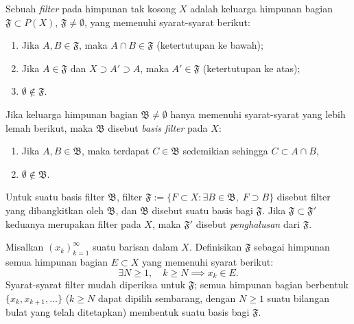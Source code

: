 \begin{definition}
	Sebuah \emph{filter} pada himpunan tak kosong $X$ adalah keluarga himpunan bagian $\mathfrak{F} \subset P(X)$, $\mathfrak{F} \neq \emptyset$, yang memenuhi syarat-syarat berikut:
	\begin{enumerate}[\bfseries {F}.1]
		\item Jika $A, B \in \mathfrak{F}$, maka $A \cap B \in \mathfrak{F}$ (ketertutupan ke bawah);
		\item Jika $A \in \mathfrak{F}$ dan $X \supset A' \supset A$, maka $A' \in \mathfrak{F}$ (ketertutupan ke atas);
		\item $\emptyset \notin \mathfrak{F}$.
	\end{enumerate}
	Jika keluarga himpunan bagian $\mathfrak{B} \neq \emptyset$ hanya memenuhi syarat-syarat yang lebih lemah berikut, maka $\mathfrak{B}$ disebut \emph{basis filter} pada $X$:
	\begin{enumerate}[\bfseries {FB}.1]
		\item Jika $A, B \in \mathfrak{B}$, maka terdapat $C \in \mathfrak{B}$ sedemikian sehingga $C \subset A \cap B$,
		\item $\emptyset \notin \mathfrak{B}$.
	\end{enumerate}
	Untuk suatu basis filter $\mathfrak{B}$, filter $\mathfrak{F} := \{ F \subset X: \exists B \in \mathfrak{B},\; F \supset B \}$ disebut filter yang dibangkitkan oleh $\mathfrak{B}$, dan $\mathfrak{B}$ disebut suatu basis bagi $\mathfrak{F}$. Jika $\mathfrak{F} \subset \mathfrak{F}'$ keduanya merupakan filter pada $X$, maka $\mathfrak{F}'$ disebut \emph{penghalusan} dari $\mathfrak{F}$.
\end{definition}

\begin{example}\label{eg:sequence-as-filter}
	Misalkan $(x_k)_{k=1}^\infty$ suatu barisan dalam $X$. Definisikan $\mathfrak{F}$ sebagai himpunan semua himpunan bagian $E \subset X$ yang memenuhi syarat berikut:
	\[ \exists N \geq 1, \quad k \geq N \implies x_k \in E . \]
	Syarat-syarat filter mudah diperiksa untuk $\mathfrak{F}$; semua himpunan bagian berbentuk $\{ x_k, x_{k+1}, \ldots\}$ ($k \geq N$ dapat dipilih sembarang, dengan $N \geq 1$ suatu bilangan bulat yang telah ditetapkan) membentuk suatu basis bagi $\mathfrak{F}$.
\end{example}

